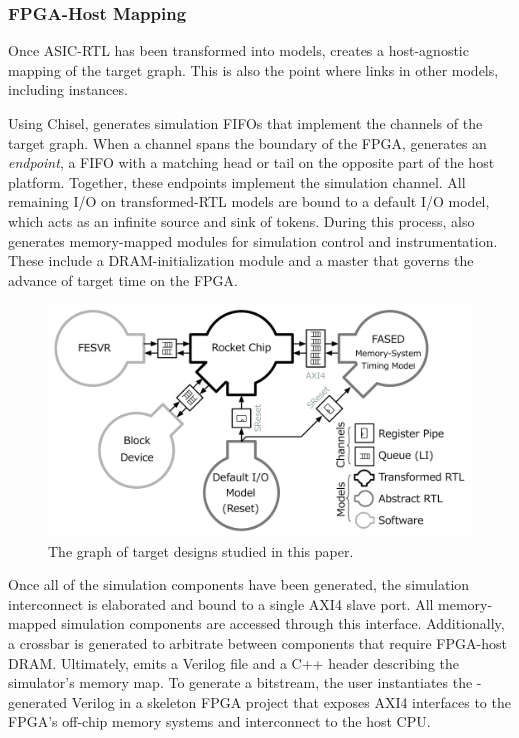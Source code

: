 \subsubsection{FPGA-Host Mapping}

Once ASIC-RTL has been transformed into models, \SIMNAME creates a host-agnostic
mapping of the target graph. This is also the point where \SIMNAME links in
other models, including \PNAME instances.

Using Chisel, \SIMNAME generates simulation FIFOs that implement the channels of
the target graph.  When a channel spans the boundary of the FPGA, \SIMNAME
generates an \emph{endpoint}, a FIFO with a matching head or tail on the
opposite part of the host platform.  Together, these endpoints implement the
simulation channel.  All remaining I/O on transformed-RTL models
are bound to a default I/O model, which acts as an infinite source and sink of
tokens.  During this process, \SIMNAME also generates memory-mapped modules for
simulation control and instrumentation. These include a DRAM-initialization
module and a master that governs the advance of target time on the FPGA.

\begin{figure}[t]
\vspace{-0.1in}
    \centering
    \includegraphics[width=\columnwidth]{figures/target-graph.pdf}
    \vspace{-0.10in}
    \caption{The graph of target designs studied in this paper.}
    \label{fig:default-target}
    \vspace{-0.15in}
\end{figure}

Once all of the simulation components have been generated, the simulation
interconnect is elaborated and bound to a single AXI4 slave port. All
memory-mapped simulation components are accessed through this
interface. Additionally, a crossbar is generated to arbitrate between components
that require FPGA-host DRAM. Ultimately, \SIMNAME emits a Verilog file and a
C++ header describing the simulator's memory map. To generate a bitstream, the
user instantiates the \SIMNAME-generated Verilog in a skeleton FPGA project
that exposes AXI4 interfaces to the FPGA's off-chip memory systems and
interconnect to the host CPU.

